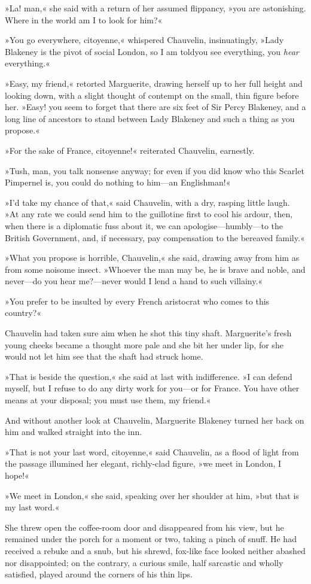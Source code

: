»La! man,« she said with a return of her assumed flippancy, »you are astonishing. Where in the world am I to look for him?«

»You go everywhere, citoyenne,« whispered Chauvelin, insinuatingly, »Lady Blakeney is the pivot of social London, so I am told\textellipsis \allowbreak  you see everything, you \textit{hear} everything.«

»Easy, my friend,« retorted Marguerite, drawing herself up to her full height and looking down, with a slight thought of contempt on the small, thin figure before her. »Easy! you seem to forget that there are six feet of Sir Percy Blakeney, and a long line of ancestors to stand between Lady Blakeney and such a thing as you propose.«

»For the sake of France, citoyenne!« reiterated Chauvelin, earnestly.

»Tush, man, you talk nonsense anyway; for even if you did know who this Scarlet Pimpernel is, you could do nothing to him—an Englishman!«

»I'd take my chance of that,« said Chauvelin, with a dry, rasping little laugh. »At any rate we could send him to the guillotine first to cool his ardour, then, when there is a diplomatic fuss about it, we can apologise—humbly—to the British Government, and, if necessary, pay compensation to the bereaved family.«

»What you propose is horrible, Chauvelin,« she said, drawing away from him as from some noisome insect. »Whoever the man may be, he is brave and noble, and never—do you hear me?—never would I lend a hand to such villainy.«

»You prefer to be insulted by every French aristocrat who comes to this country?«

Chauvelin had taken sure aim when he shot this tiny shaft. Marguerite's fresh young cheeks became a thought more pale and she bit her under lip, for she would not let him see that the shaft had struck home.

»That is beside the question,« she said at last with indifference. »I can defend myself, but I refuse to do any dirty work for you—or for France. You have other means at your disposal; you must use them, my friend.«

And without another look at Chauvelin, Marguerite Blakeney turned her back on him and walked straight into the inn.

»That is not your last word, citoyenne,« said Chauvelin, as a flood of light from the passage illumined her elegant, richly-clad figure, »we meet in London, I hope!«

»We meet in London,« she said, speaking over her shoulder at him, »but that is my last word.«

She threw open the coffee-room door and disappeared from his view, but he remained under the porch for a moment or two, taking a pinch of snuff. He had received a rebuke and a snub, but his shrewd, fox-like face looked neither abashed nor disappointed; on the contrary, a curious smile, half sarcastic and wholly satisfied, played around the corners of his thin lips.